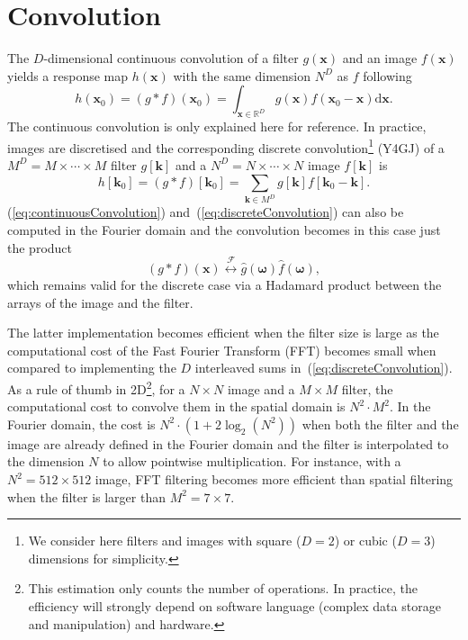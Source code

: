 \documentclass[fleqn,a4paper,oneside,openany]{book}
\newcommand\textid[1]{{\normalsize{\idfont #1}}}
\begin{document}
\chapter{Convolution}\label{sec:convolution}
%
The $D$-dimensional continuous convolution of a filter $g(\boldsymbol{x})$ and an image $f(\boldsymbol{x})$ yields a response map $h(\boldsymbol{x})$ with the same dimension $N^D$ as $f$ following
%
\begin{equation}\label{eq:continuousConvolution}
h(\boldsymbol{x}_0)=(g\ast f)(\boldsymbol{x}_0)=
\int_{\boldsymbol{x}\in\mathbb{R}^D}
g(\boldsymbol{x})f(\boldsymbol{x}_0-\boldsymbol{x})
\mathrm{d}\boldsymbol{x}.
\end{equation}
%
The continuous convolution is only explained here for reference. 
In practice, images are discretised and the corresponding discrete convolution\footnote{We consider here filters and images with square ($D=2$) or cubic ($D=3$) dimensions for simplicity.} (\textid{Y4GJ}) of a $M^D=M\times\cdots\times M$ filter $g[\boldsymbol{k}]$ and a $N^D=N\times\cdots\times N$  image $f[\boldsymbol{k}]$ is
%
\begin{equation}\label{eq:discreteConvolution}
h[\boldsymbol{k}_0]=(g\ast f)[\boldsymbol{k}_0]=
\sum_{\boldsymbol{k}\in M^D}
g[\boldsymbol{k}]f[\boldsymbol{k}_0-\boldsymbol{k}].
\end{equation}
%
(\ref{eq:continuousConvolution}) and~(\ref{eq:discreteConvolution}) can also be computed in the Fourier domain and the convolution becomes in this case just the product
%
\begin{equation}\label{eq:convolutionFFT}
(g \ast f) (\boldsymbol{x})  \overset{\mathcal{F}}{\longleftrightarrow}   \hat{g}(\boldsymbol{\omega}) \hat{f}(\boldsymbol{\omega}),
\end{equation}
%
which remains valid for the discrete case via a Hadamard product between the arrays of the image and the filter.

The latter implementation becomes efficient when the filter size is large as the computational cost of the Fast Fourier Transform (FFT) becomes small when compared to implementing the $D$ interleaved sums in~(\ref{eq:discreteConvolution}).
As a rule of thumb in 2D\footnote{This estimation only counts the number of operations. In practice, the efficiency will strongly depend on software language (complex data storage and manipulation) and hardware.}, for a $N\times N$ image and a $M\times M$ filter, the computational cost to convolve them in the spatial domain is $N^2 \cdot M^2$.
In the Fourier domain, the cost is $N^2\cdot(1+2\log_2(N^2))$ when both the filter and the image are already defined in the Fourier domain and the filter is interpolated to the dimension $N$ to allow pointwise multiplication.
For instance, with a $N^2=512\times 512$ image, FFT filtering becomes more efficient than spatial filtering when the filter is larger than $M^2=7\times 7$.
\end{document}
